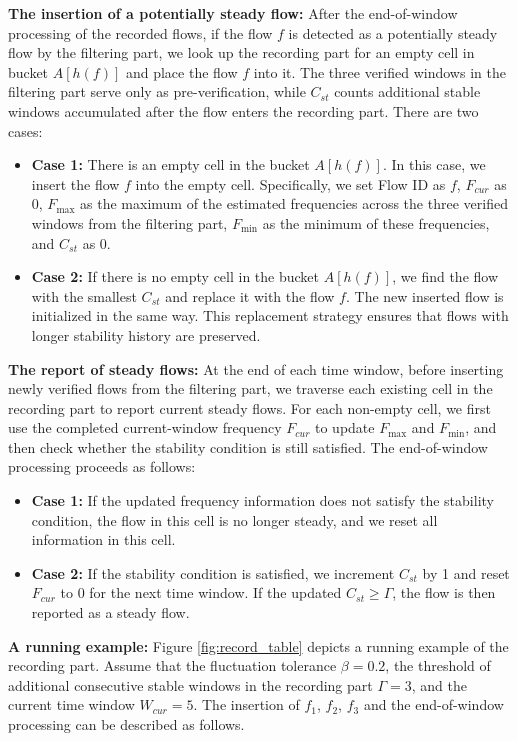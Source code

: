 \documentclass[preprint,12pt]{elsarticle}
\begin{document}
\textbf{The insertion of a potentially steady flow:} After the end-of-window processing of the recorded flows, if the flow $f$ is detected as a potentially steady flow by the filtering part, we look up the recording part for an empty cell in bucket $A[h(f)]$ and place the flow $f$ into it. The three verified windows in the filtering part serve only as pre-verification, while $C_{st}$ counts additional stable windows accumulated after the flow enters the recording part. There are two cases:
\begin{itemize}
    \item \textbf{Case 1:} There is an empty cell in the bucket $A[h(f)]$. In this case, we insert the flow $f$ into the empty cell. Specifically, we set Flow ID as $f$, $F_{cur}$ as 0, $F_{\max}$ as the maximum of the estimated frequencies across the three verified windows from the filtering part, $F_{\min}$ as the minimum of these frequencies, and $C_{st}$ as 0.
    \item \textbf{Case 2:} If there is no empty cell in the bucket $A[h(f)]$, we find the flow with the smallest $C_{st}$ and replace it with the flow $f$. The new inserted flow is initialized in the same way. This replacement strategy ensures that flows with longer stability history are preserved.
\end{itemize}

\textbf{The report of steady flows:} At the end of each time window, before inserting newly verified flows from the filtering part, we traverse each existing cell in the recording part to report current steady flows. For each non-empty cell, we first use the completed current-window frequency $F_{cur}$ to update $F_{\max}$ and $F_{\min}$, and then check whether the stability condition is still satisfied. The end-of-window processing proceeds as follows:
\begin{itemize}
    \item \textbf{Case 1:} If the updated frequency information does not satisfy the stability condition, the flow in this cell is no longer steady, and we reset all information in this cell.
    \item \textbf{Case 2:} If the stability condition is satisfied, we increment $C_{st}$ by 1 and reset $F_{cur}$ to 0 for the next time window. If the updated $C_{st} \ge \Gamma$, the flow is then reported as a steady flow.
\end{itemize}

\textbf{A running example:} Figure \ref{fig:record_table} depicts a running example of the recording part. Assume that the fluctuation tolerance $\beta = 0.2$, the threshold of additional consecutive stable windows in the recording part $\Gamma = 3$, and the current time window $W_{cur} = 5$. The insertion of $f_1$, $f_2$, $f_3$ and the end-of-window processing can be described as follows.
\end{document}
